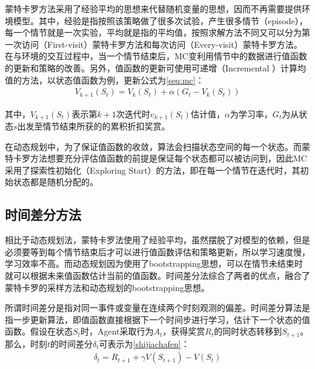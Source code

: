 蒙特卡罗方法采用了经验平均的思想来代替随机变量的思想，因而不再需要提供环境模型。其中，经验是指按照该策略做了很多次试验，产生很多情节（episode），每一个情节就是一次实验，平均就是指的平均值，按照求解方法不同又可以分为第一次访问（First-visit）蒙特卡罗方法和每次访问（Every-visit）蒙特卡罗方法。在与环境的交互过程中，当一个情节结束后，MC变利用情节中的数据进行值函数的更新和策略的改善。另外，值函数的更新可使用可递增（Incremental ）计算均值的方法，以状态值函数为例，更新公式为\eqref{seq:mc}：
\begin{equation}\label{seq:mc}
\begin{aligned}
V_{k+1}(S_{t})=V_{k}(S_{t})+ \alpha(G_{t}-V_{k}(S_{t}))
\end{aligned}
\end{equation}

其中，$V_{k+1}(S_{t})$表示第$k+1$次迭代时$v_{k+1}(S_{t})$估计值，$\alpha$为学习率，$G_{t}$为从状态$s$出发至情节结束所获的的累积折扣奖赏。

在动态规划中，为了保证值函数的收敛，算法会扫描状态空间的每一个状态。而蒙特卡罗方法想要充分评估值函数的前提是保证每个状态都可以被访问到，因此MC采用了探索性初始化（Exploring Start）的方法，即在每一个情节在迭代时，其初始状态都是随机分配的。

\subsection{时间差分方法}
相比于动态规划法，蒙特卡罗法使用了经验平均，虽然摆脱了对模型的依赖，但是必须要等到每个情节结束后才可以进行值函数评估和策略更新，所以学习速度慢，学习效率不高。而动态规划因为使用了bootstrapping思想，可以在情节未结束时就可以根据未来值函数估计当前的值函数。时间差分法综合了两者的优点，融合了蒙特卡罗的采样方法和动态规划的bootstrapping思想。

所谓时间差分是指对同一事件或变量在连续两个时刻观测的偏差。时间差分算法是指一步更新算法，即值函数直接根据下一个时间步进行学习，估计下一个状态的值函数。假设在状态$S_{t}$时，Agent采取行为$A_{t}$，获得奖赏$R_{t}$的同时状态转移到$S_{t+1}$。
那么，时刻$t$的时间差分$\delta_{t}$可表示为\eqref{shijiachafen}：
\begin{equation}\label{shijiachafen}
\begin{aligned}
\delta_{t}=R_{t+1}+\gamma V(S_{t+1})-V(S_{t})
\end{aligned}
\end{equation}

